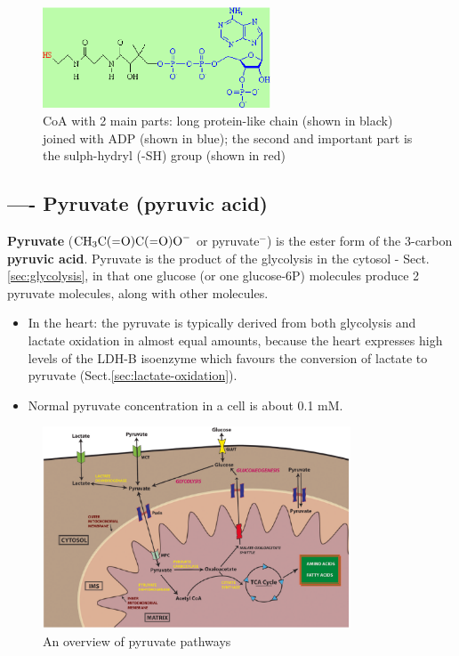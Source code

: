 \begin{figure}[hbt]
  \centerline{\includegraphics[height=3cm,
    angle=0]{./images/CoA.eps}}
  \caption{CoA with 2 main parts: long protein-like chain (shown in
    black) joined with ADP (shown in blue); the second and important
    part is the sulph-hydryl (-SH) group (shown in red) }
  \label{fig:CoA}
\end{figure}



\subsection{---- Pyruvate (pyruvic acid)}
\label{sec:pyruvate}
\label{sec:pyruvic-acid}

{\bf Pyruvate} ($\ce{CH3C(=O)C(=O)O-}$ or pyruvate$^{-}$) is the ester form of
the 3-carbon {\bf pyruvic acid}. Pyruvate is the product of the glycolysis in the cytosol -
Sect.\ref{sec:glycolysis}, in that one glucose (or one glucose-6P) molecules
produce 2 pyruvate molecules, along with other molecules.
\begin{itemize}
  \item  In the heart: the pyruvate is typically derived from both glycolysis
  and lactate oxidation in almost equal amounts, because the heart expresses
  high levels of the LDH-B isoenzyme which favours the conversion of lactate to
  pyruvate (Sect.\ref{sec:lactate-oxidation}).

  \item  Normal pyruvate concentration in a cell is about 0.1 mM.
\end{itemize}

\begin{figure}[hbt]
  \centerline{\includegraphics[height=6cm,
    angle=0]{./images/pyruvate-pathways.eps}}
\caption{An overview of pyruvate pathways}
\label{fig:pyruvate-pathways}
\end{figure}


